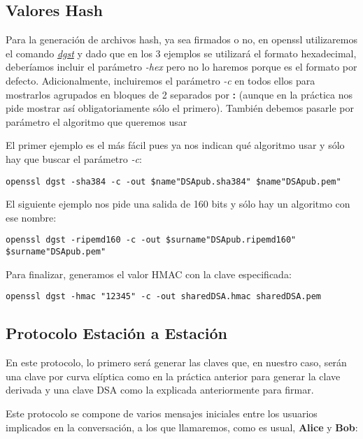 \documentclass[a4paper, 11pt]{article}
\begin{document}
	\subsection{Valores Hash}
		Para la generación de archivos hash, ya sea firmados o no, en openssl utilizaremos el comando
		\href{https://www.openssl.org/docs/man1.0.2/apps/dgst.html}{\textit{dgst}} y dado que en los 3 ejemplos
		se utilizará el formato hexadecimal, deberíamos incluir el parámetro \textit{-hex} pero no lo haremos
		porque es el formato por defecto. Adicionalmente, incluiremos el parámetro \textit{-c} en todos ellos
		para mostrarlos agrupados en bloques de 2 separados por \textbf{:} (aunque en la práctica nos pide mostrar
		así obligatoriamente sólo el primero). También debemos pasarle por parámetro el algoritmo que queremos usar
		
		El primer ejemplo es el más fácil pues ya nos indican qué algoritmo usar y sólo hay que buscar el parámetro
		\textit{-c}:\\
		\begin{small}
			\verb|openssl dgst -sha384 -c -out $name"DSApub.sha384" $name"DSApub.pem"|
		\end{small}
		
		El siguiente ejemplo nos pide una salida de 160 bits y sólo hay un algoritmo con ese nombre:\\
		\begin{small}
			\verb|openssl dgst -ripemd160 -c -out $surname"DSApub.ripemd160" $surname"DSApub.pem"|
		\end{small}
		
		Para finalizar, generamos el valor HMAC con la clave especificada:\\
		\begin{small}
			\verb|openssl dgst -hmac "12345" -c -out sharedDSA.hmac sharedDSA.pem|
		\end{small}

	\subsection{Protocolo Estación a Estación}
		En este protocolo, lo primero será generar las claves que, en nuestro caso, serán una clave por curva elíptica como
		en la práctica anterior para generar la clave derivada y una clave DSA como la explicada anteriormente para firmar.
		
		Este protocolo se compone de varios mensajes iniciales entre los usuarios implicados en la conversación, a los que
		llamaremos, como es usual, \textbf{Alice} y \textbf{Bob}:
		
\end{document}
